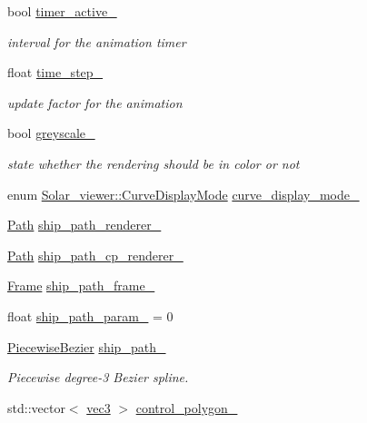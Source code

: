 \begin{DoxyCompactItemize}
bool \hyperlink{classSolar__viewer_aedc75568a6aafd2ecf8245ed518f6214}{timer\+\_\+active\+\_\+}
\begin{DoxyCompactList}\small\item\em interval for the animation timer \end{DoxyCompactList}\item 
float \hyperlink{classSolar__viewer_ad2ff1703788f0c694bd8e6e8be5c3be5}{time\+\_\+step\+\_\+}
\begin{DoxyCompactList}\small\item\em update factor for the animation \end{DoxyCompactList}\item 
bool \hyperlink{classSolar__viewer_ad0da37e7839ea05cd500c59eacfc04cb}{greyscale\+\_\+}
\begin{DoxyCompactList}\small\item\em state whether the rendering should be in color or not \end{DoxyCompactList}\item 
enum \hyperlink{classSolar__viewer_a81992414d6b7f79184b903adffca6d88}{Solar\+\_\+viewer\+::\+Curve\+Display\+Mode} \hyperlink{classSolar__viewer_a42bdd7e9bad9f049ae3c9d8dcb8f40ec}{curve\+\_\+display\+\_\+mode\+\_\+}
\item 
\hyperlink{classPath}{Path} \hyperlink{classSolar__viewer_a42b89bbee0c692097061b52d35ecf772}{ship\+\_\+path\+\_\+renderer\+\_\+}
\item 
\hyperlink{classPath}{Path} \hyperlink{classSolar__viewer_a3b486b4a6d1d555296aa064127fabd2f}{ship\+\_\+path\+\_\+cp\+\_\+renderer\+\_\+}
\item 
\hyperlink{structFrame}{Frame} \hyperlink{classSolar__viewer_ae8f77efc9fcff33bd7c71dd37cbef2a1}{ship\+\_\+path\+\_\+frame\+\_\+}
\item 
float \hyperlink{classSolar__viewer_a3f197b01ef63db24545632dac7e3ca9c}{ship\+\_\+path\+\_\+param\+\_\+} = 0
\item 
\hyperlink{classPiecewiseBezier}{Piecewise\+Bezier} \hyperlink{classSolar__viewer_a717ac56af4cceb1d8606f5e050c46d57}{ship\+\_\+path\+\_\+}
\begin{DoxyCompactList}\small\item\em Piecewise degree-\/3 Bezier spline. \end{DoxyCompactList}\item 
std\+::vector$<$ \hyperlink{classvec3}{vec3} $>$ \hyperlink{classSolar__viewer_a67aa3b5cdacc2c7f2947ad2d72c6ce32}{control\+\_\+polygon\+\_\+}
\item 

\end{DoxyCompactItemize}

